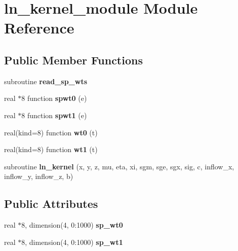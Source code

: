 \hypertarget{classln__kernel__module}{\section{ln\+\_\+kernel\+\_\+module Module Reference}
\label{classln__kernel__module}
}
\subsection*{Public Member Functions}
\begin{DoxyCompactItemize}
\item 
\hypertarget{classln__kernel__module_aad8f2e59c335886b3a8a50e3f132eaa5}{subroutine {\bfseries read\+\_\+sp\+\_\+wts}}\label{classln__kernel__module_aad8f2e59c335886b3a8a50e3f132eaa5}

\item 
\hypertarget{classln__kernel__module_a2714ae332964aba16f4bf2490d4ad586}{real $\ast$8 function {\bfseries spwt0} (e)}\label{classln__kernel__module_a2714ae332964aba16f4bf2490d4ad586}

\item 
\hypertarget{classln__kernel__module_a96ab2ee2973c0667493bf3d5fd00ba04}{real $\ast$8 function {\bfseries spwt1} (e)}\label{classln__kernel__module_a96ab2ee2973c0667493bf3d5fd00ba04}

\item 
\hypertarget{classln__kernel__module_a9ab6aa3cccdaf9b53a929dd30a31961b}{real(kind=8) function {\bfseries wt0} (t)}\label{classln__kernel__module_a9ab6aa3cccdaf9b53a929dd30a31961b}

\item 
\hypertarget{classln__kernel__module_a61433a9c616f7e015071386c1ce8ea4e}{real(kind=8) function {\bfseries wt1} (t)}\label{classln__kernel__module_a61433a9c616f7e015071386c1ce8ea4e}

\item 
\hypertarget{classln__kernel__module_a656058bc673334c98c866f725c8f6c30}{subroutine {\bfseries ln\+\_\+kernel} (x, y, z, mu, eta, xi, sgm, sge, sgx, sig, c, inflow\+\_\+x, inflow\+\_\+y, inflow\+\_\+z, b)}\label{classln__kernel__module_a656058bc673334c98c866f725c8f6c30}

\end{DoxyCompactItemize}
\subsection*{Public Attributes}
\begin{DoxyCompactItemize}
\item 
\hypertarget{classln__kernel__module_acb86edae3ad6ba5f5d76b8480cc1a0c3}{real $\ast$8, dimension(4, 0\+:1000) {\bfseries sp\+\_\+wt0}}\label{classln__kernel__module_acb86edae3ad6ba5f5d76b8480cc1a0c3}

\item 
\hypertarget{classln__kernel__module_a0b4b87e5c568b8a78eaababf7fc2ffba}{real $\ast$8, dimension(4, 0\+:1000) {\bfseries sp\+\_\+wt1}}\label{classln__kernel__module_a0b4b87e5c568b8a78eaababf7fc2ffba}

\end{DoxyCompactItemize}


